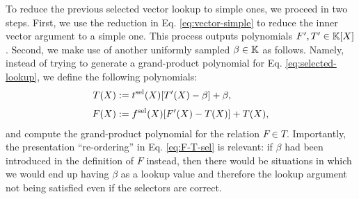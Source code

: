 To reduce the previous selected vector lookup to simple ones, we proceed in two steps. First, we use the reduction in Eq. \eqref{eq:vector-simple} to reduce the inner vector argument to a simple one. This process outputs polynomials $F',T' \in \mathbb{K}[X]$. Second, we make use of another uniformly sampled $\beta \in \mathbb{K}$ as follows. Namely, instead of trying to generate a grand-product polynomial for Eq. \eqref{eq:selected-lookup}, we define the following polynomials:
\begin{align}\label{eq:F-T-sel}
\begin{split}
T(X) &:= t^{\text{sel}}(X) [T'(X) - \beta] + \beta, \\[0.1cm]
F(X) &:= f^{\text{sel}}(X) [F'(X) - T(X)] + T(X),
\end{split}
\end{align}
and compute the grand-product polynomial for the relation $F \in T$. 
Importantly, the presentation ``re-ordering'' in Eq. \eqref{eq:F-T-sel} is relevant: if $\beta$ had been introduced in the definition of $F$ instead, then there would be situations in which we would end up having $\beta$ as a lookup value and therefore the lookup argument not being satisfied even if the selectors are correct.
